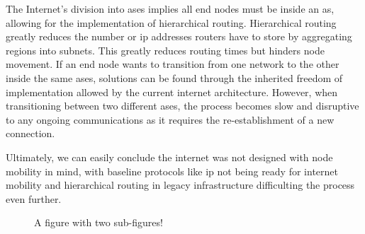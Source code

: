 
The Internet’s division into \gls{as}es implies all end nodes must be inside an \gls{as}, allowing for the implementation of hierarchical routing. Hierarchical routing greatly reduces the number or \gls{ip} addresses routers have to store by aggregating regions into subnets. This greatly reduces routing times but hinders node movement.
If an end node wants to transition from one network to the other inside the same \gls{as}es, solutions can be found through the inherited freedom of implementation allowed by the current internet architecture. However, when transitioning between two different \gls{as}es, the process becomes slow and disruptive to any ongoing communications as it requires the re-establishment of a new connection.

Ultimately, we can easily conclude the internet was not designed with node mobility in mind, with baseline protocols like \gls{ip} not being ready for internet mobility and hierarchical routing in legacy infrastructure difficulting the process even further.



\begin{figure}[htbp]
    \centering
    \caption{A figure with two sub-figures!}
    \label{fig:fig2subfig}
\end{figure}
  
